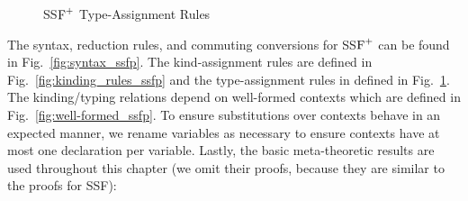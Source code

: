 \begin{figure}
  \setlength{\tabcolsep}{1pt}
    
    \caption{SS$\mbox{F}^{+}$ Type-Assignment Rules}
    \label{fig:typing_rules_ssfp}
  
\end{figure}
The syntax, reduction rules, and commuting conversions for SS$\mbox{F}^{+}$ can
be found in Fig.~\ref{fig:syntax_ssfp}.  The kind-assignment rules are
defined in Fig.~\ref{fig:kinding_rules_ssfp} and the type-assignment
rules in defined in Fig.~\ref{fig:typing_rules_ssfp}. The
kinding/typing relations depend on well-formed contexts which are
defined in Fig.~\ref{fig:well-formed_ssfp}.  To ensure substitutions
over contexts behave in an expected manner, we rename variables as
necessary to ensure contexts have at most one declaration per
variable.  Lastly, the basic meta-theoretic results are used
throughout this chapter (we omit their proofs, because they are
similar to the proofs for SSF):

